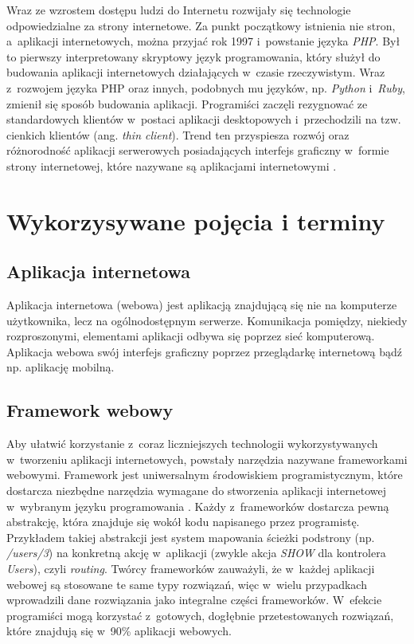\documentclass[mgr,oneside]{mgr}
\begin{document}
Wraz ze wzrostem dostępu ludzi do Internetu rozwijały się technologie odpowiedzialne za strony internetowe. Za punkt początkowy istnienia nie stron, a~aplikacji internetowych, można przyjać rok 1997 i~powstanie języka \emph{PHP}. Był to pierwszy interpretowany skryptowy język programowania, który służył do budowania aplikacji internetowych działających w~czasie rzeczywistym. Wraz z~rozwojem języka PHP oraz innych, podobnych mu języków, np. \emph{Python} i~\emph{Ruby}, zmienił się sposób budowania aplikacji. Programiści zaczęli rezygnować ze standardowych klientów w~postaci aplikacji desktopowych i~przechodzili na tzw. cienkich klientów (ang. \textit{thin client}). Trend ten przyspiesza rozwój oraz różnorodność aplikacji serwerowych posiadających interfejs graficzny w~formie strony internetowej, które nazywane są aplikacjami internetowymi \cite{historia}.

\section{Wykorzysywane pojęcia i terminy}
\subsection{Aplikacja internetowa}
Aplikacja internetowa (webowa) jest aplikacją znajdującą się nie na komputerze użytkownika, lecz na ogólnodostępnym serwerze. Komunikacja pomiędzy, niekiedy rozproszonymi, elementami aplikacji odbywa się poprzez sieć komputerową. Aplikacja webowa swój interfejs graficzny poprzez przeglądarkę internetową bądź np. aplikację mobilną.

\subsection{Framework webowy} %
Aby ułatwić korzystanie z~coraz liczniejszych technologii wykorzystywanych w~tworzeniu aplikacji internetowych, powstały narzędzia nazywane frameworkami webowymi. Framework jest uniwersalnym środowiskiem programistycznym, które dostarcza niezbędne narzędzia wymagane do stworzenia aplikacji internetowej w~wybranym języku programowania \cite{framework}. Każdy z~frameworków dostarcza pewną abstrakcję, która znajduje się wokół kodu napisanego przez programistę. Przykładem takiej abstrakcji jest system mapowania ścieżki podstrony (np. \textit{/users/3}) na konkretną akcję w~aplikacji (zwykle akcja \emph{SHOW} dla kontrolera \emph{Users}), czyli \emph{routing}. Twórcy frameworków zauważyli, że w~każdej aplikacji webowej są stosowane te same typy rozwiązań, więc w~wielu przypadkach wprowadzili dane rozwiązania jako integralne części frameworków. W~efekcie programiści mogą korzystać z~gotowych, dogłębnie przetestowanych rozwiązań, które znajdują się w~90\% aplikacji webowych.
\end{document}
